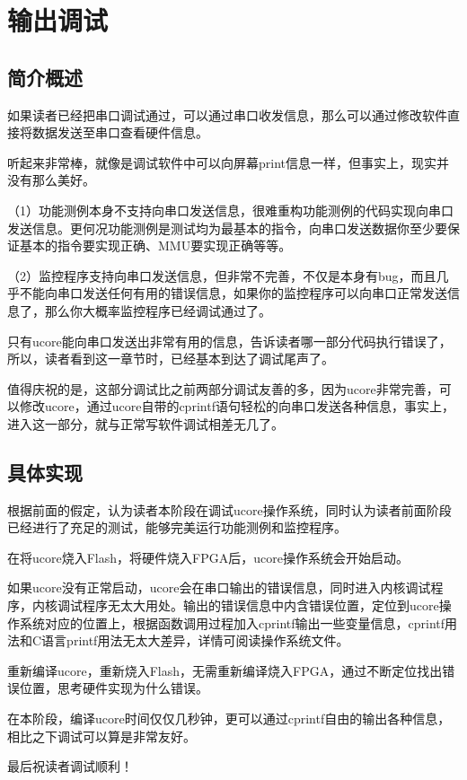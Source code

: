 \chapter{输出调试}

\section{简介概述}

如果读者已经把串口调试通过，可以通过串口收发信息，那么可以通过修改软件直接将数据发送至串口查看硬件信息。

听起来非常棒，就像是调试软件中可以向屏幕print信息一样，但事实上，现实并没有那么美好。

（1）功能测例本身不支持向串口发送信息，很难重构功能测例的代码实现向串口发送信息。更何况功能测例是测试均为最基本的指令，向串口发送数据你至少要保证基本的指令要实现正确、MMU要实现正确等等。

（2）监控程序支持向串口发送信息，但非常不完善，不仅是本身有bug，而且几乎不能向串口发送任何有用的错误信息，如果你的监控程序可以向串口正常发送信息了，那么你大概率监控程序已经调试通过了。

只有ucore能向串口发送出非常有用的信息，告诉读者哪一部分代码执行错误了，所以，读者看到这一章节时，已经基本到达了调试尾声了。

值得庆祝的是，这部分调试比之前两部分调试友善的多，因为ucore非常完善，可以修改ucore，通过ucore自带的cprintf语句轻松的向串口发送各种信息，事实上，进入这一部分，就与正常写软件调试相差无几了。

\section{具体实现}

根据前面的假定，认为读者本阶段在调试ucore操作系统，同时认为读者前面阶段已经进行了充足的测试，能够完美运行功能测例和监控程序。

在将ucore烧入Flash，将硬件烧入FPGA后，ucore操作系统会开始启动。

如果ucore没有正常启动，ucore会在串口输出的错误信息，同时进入内核调试程序，内核调试程序无太大用处。输出的错误信息中内含错误位置，定位到ucore操作系统对应的位置上，根据函数调用过程加入cprintf输出一些变量信息，cprintf用法和C语言printf用法无太大差异，详情可阅读操作系统文件。

重新编译ucore，重新烧入Flash，无需重新编译烧入FPGA，通过不断定位找出错误位置，思考硬件实现为什么错误。

在本阶段，编译ucore时间仅仅几秒钟，更可以通过cprintf自由的输出各种信息，相比之下调试可以算是非常友好。

最后祝读者调试顺利！